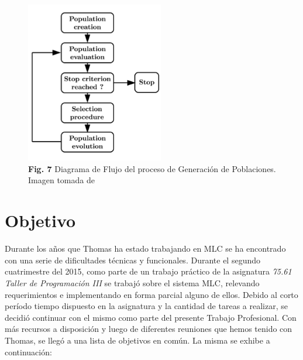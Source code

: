 \documentclass[a4paper,10pt]{article}
\begin{document}
        \begin{figure}[!Hhtb]
            \centering
            \includegraphics[width=6cm,origin=c]{Imagenes/flow_diagram.png}
            \caption{\textbf{Fig. 7} Diagrama de Flujo del proceso de Generación de Poblaciones.
            Imagen tomada de \cite{Duriez2016}} \label{fig007}
        \end{figure}

    \newpage
    \section{Objetivo}
        Durante los años que Thomas ha estado trabajando en MLC se ha encontrado con una serie de dificultades técnicas y
        funcionales. Durante el segundo cuatrimestre del 2015, como parte de un trabajo práctico de la asignatura \textit{75.61 Taller de
        Programación III} se trabajó sobre el sistema MLC, relevando requerimientos e implementando en forma parcial alguno de ellos. 
        Debido al corto período tiempo dispuesto en la asignatura y la cantidad de tareas a realizar, se decidió continuar con el mismo
        como parte del presente Trabajo Profesional. Con más recursos a disposición y luego de diferentes reuniones que hemos tenido con
        Thomas, se llegó a una lista de objetivos en común. La misma se exhibe a continuación:
\end{document}
